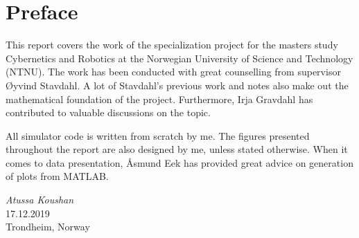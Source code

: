 \chapter{Preface}

This report covers the work of the specialization project for the masters study Cybernetics and Robotics at the Norwegian University of Science and Technology (NTNU). 
The work has been conducted with great counselling from supervisor Øyvind Stavdahl. A lot of Stavdahl's previous work and notes also make out the mathematical foundation of the project. 
Furthermore, Irja Gravdahl has contributed to valuable discussions on the topic.

All simulator code is written from scratch by me. The figures presented throughout the report are also designed by me, unless stated otherwise. When it comes to data presentation, Åsmund Eek has provided great advice on generation of plots from MATLAB.


\medskip
\begin {flushright}
  \textit{Atussa Koushan} \\
  \textsc {17.12.2019} \\
  Trondheim, Norway
\end {flushright}



\makeatletter
{}


\makeatother




